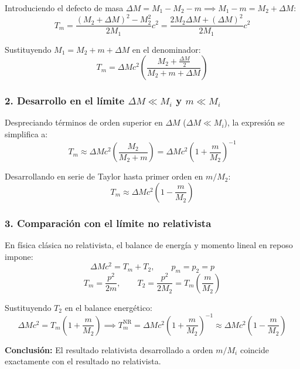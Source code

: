 \begin{problema}
Introduciendo el defecto de masa $\Delta M = M_1 - M_2 - m \implies M_1 - m = M_2 + \Delta M$:
\begin{equation*}
T_m = \frac{(M_2 + \Delta M)^2 - M_2^2}{2 M_1} c^2 = \frac{2 M_2 \Delta M + (\Delta M)^2}{2 M_1} c^2
\end{equation*}

Sustituyendo $M_1 = M_2 + m + \Delta M$ en el denominador:
\begin{equation*}
T_m = \Delta M c^2 \left( \frac{M_2 + \frac{\Delta M}{2}}{M_2 + m + \Delta M} \right)
\end{equation*}

\subsubsection*{2. Desarrollo en el límite $\Delta M \ll M_i$ y $m \ll M_i$}

Despreciando términos de orden superior en $\Delta M$ ($\Delta M \ll M_i$), la expresión se simplifica a:
\begin{equation*}
T_m \approx \Delta M c^2 \left( \frac{M_2}{M_2 + m} \right) = \Delta M c^2 \left( 1 + \frac{m}{M_2} \right)^{-1}
\end{equation*}

Desarrollando en serie de Taylor hasta primer orden en $m/M_2$:
\begin{equation*}
T_m \approx \Delta M c^2 \left( 1 - \frac{m}{M_2} \right)
\end{equation*}

\subsubsection*{3. Comparación con el límite no relativista}

En física clásica no relativista, el balance de energía y momento lineal en reposo impone:
\begin{equation*}
\Delta M c^2 = T_m + T_2, \qquad p_m = p_2 = p
\end{equation*}
\begin{equation*}
T_m = \frac{p^2}{2m}, \qquad T_2 = \frac{p^2}{2 M_2} = T_m \left(\frac{m}{M_2}\right)
\end{equation*}

Sustituyendo $T_2$ en el balance energético:
\begin{equation*}
\Delta M c^2 = T_m \left( 1 + \frac{m}{M_2} \right) \implies T_m^{\text{NR}} = \Delta M c^2 \left( 1 + \frac{m}{M_2} \right)^{-1} \approx \Delta M c^2 \left( 1 - \frac{m}{M_2} \right)
\end{equation*}

\textbf{Conclusión:} El resultado relativista desarrollado a orden $m/M_i$ coincide exactamente con el resultado no relativista.
\end{problema}

